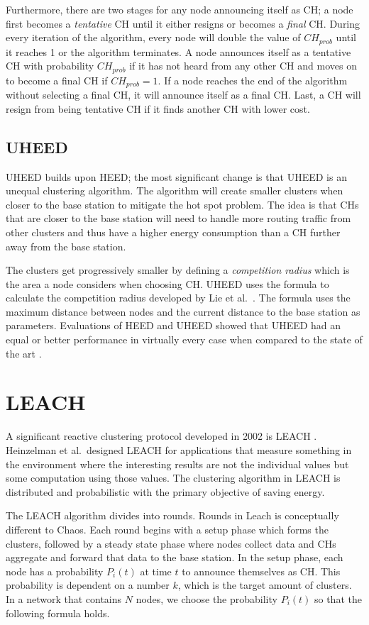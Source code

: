 Furthermore, there are two stages for any node announcing itself as CH; a node first becomes a \textit{tentative} CH until it either resigns or becomes a \textit{final} CH. During every iteration of the algorithm, every node will double the value of $CH_{prob}$ until it reaches 1 or the algorithm terminates. A node announces itself as a tentative CH with probability $CH_{prob}$ if it has not heard from any other CH and moves on to become a final CH if $CH_{prob} = 1$. If a node reaches the end of the algorithm without selecting a final CH, it will announce itself as a final CH. Last, a CH will resign from being tentative CH if it finds another CH with lower cost.

\subsection{UHEED}
UHEED \cite{Ever2012-UHEED} builds upon HEED; the most significant change is that UHEED is an unequal clustering algorithm. The algorithm will create smaller clusters when closer to the base station to mitigate the hot spot problem. The idea is that CHs that are closer to the base station will need to handle more routing traffic from other clusters and thus have a higher energy consumption than a CH further away from the base station.

The clusters get progressively smaller by defining a \textit{competition radius} which is the area a node considers when choosing CH. UHEED uses the formula to calculate the competition radius developed by Lie et al.~\cite{Li2005-EEUC}. The formula uses the maximum distance between nodes and the current distance to the base station as parameters. Evaluations of HEED and UHEED showed that UHEED had an equal or better performance in virtually every case when compared to the state of the art \cite{Ever2012-UHEED}.


\section{LEACH}
A significant reactive clustering protocol developed in 2002 is LEACH \cite{Heinzelman2002-leach}. Heinzelman et al.~designed LEACH for applications that measure something in the environment where the interesting results are not the individual values but some computation using those values. The clustering algorithm in LEACH is distributed and probabilistic with the primary objective of saving energy.

The LEACH algorithm divides into rounds. Rounds in Leach is conceptually different to Chaos. Each round begins with a setup phase which forms the clusters, followed by a steady state phase where nodes collect data and CHs aggregate and forward that data to the base station. In the setup phase, each node has a probability $P_i(t)$ at time $t$ to announce themselves as CH. This probability is dependent on a number $k$, which is the target amount of clusters. In a network that contains $N$ nodes, we choose the probability $P_i(t)$ so that the following formula holds.

